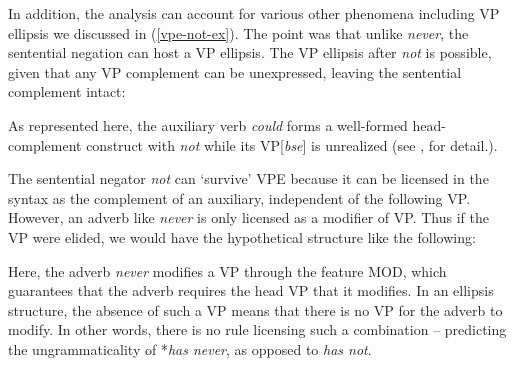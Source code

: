 \documentclass[output=paper]{langsci/langscibook}
\begin{document}
In addition, the analysis can account for various other phenomena
including VP ellipsis we discussed in (\ref{vpe-not-ex}). The point
was that unlike {\it never}, the sentential negation can
host a VP ellipsis.  The VP ellipsis after {\it not} is
possible, given that any VP complement can be unexpressed, leaving
the sentential complement intact:

\be
\ex {}
\ee
%
As represented here, the auxiliary verb \emph{could} forms a
well-formed head-complement construct with \emph{not} while its
VP[{\it bse}] is unrealized (see \citet{Kim:00}, \citet{KS:08} for
detail.).

The sentential negator \emph{not} can `survive' VPE because it can be
licensed in the syntax as the complement of an auxiliary, independent
of the following VP.  However, an adverb like \emph{never} is only
licensed as a modifier of VP. Thus if the VP were elided, we would have the hypothetical
structure like the following:

\be
\ex {}
\ee

Here, the adverb \emph{never} modifies a VP through the feature MOD,
which guarantees that the adverb requires the head VP that it
modifies. In an ellipsis structure, the absence of such a VP means
that there is no VP for the adverb to modify.  In other words, there
is no rule licensing such a combination -- predicting the
ungrammaticality of
*\emph{has never},  as opposed to \emph{has
not}.
\end{document}

